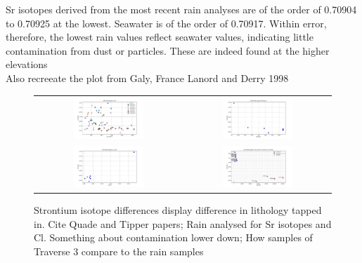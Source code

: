 Sr isotopes derived from the most recent rain analyses are of the order of 0.70904 to 0.70925 at the lowest. Seawater is of the order of 0.70917. Within error, therefore, the lowest rain values reflect seawater values, indicating little contamination from dust or particles. These are indeed found at the higher elevations \\


Also recreeate the plot from Galy, France Lanord and Derry 1998
\begin{figure}[h]
    \centering
    \begin{tabular}{cc}
        \includegraphics[width=0.5\textwidth]{Sr87_Sr86_1_Sr.pdf} & \includegraphics[width=0.5\textwidth]{Sr87_Sr86_Elevation.pdf} \\
        \includegraphics[width=0.5\textwidth]{Sr87_Sr86_Cl.pdf} & \includegraphics[width=0.5\textwidth]{Sr87_Sr86_1Sr_Rain.pdf} \\
    \end{tabular}
    \caption{Strontium isotope differences display difference in lithology tapped in. Cite Quade and Tipper papers; Rain analysed for Sr isotopes and Cl. Something about contamination lower down; How samples of Traverse 3 compare to the rain samples}
    \label{fig:discussion3}
\end{figure}

